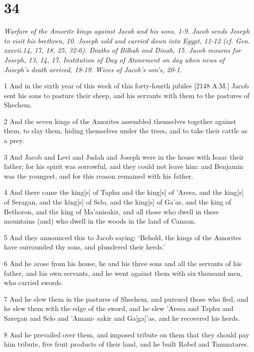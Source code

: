 \chapter{34}

\par \textit{Warfare of the Amorite kings against Jacob and his sons, 1-9. Jacob sends Joseph to visit his brethren, 10. Joseph sold and carried down into Egypt, 11-12 (cf. Gen. xxxvii.14, 17, 18, 25, 32-6). Deaths of Bilhah and Dinah, 15. Jacob mourns for Joseph, 13, 14, 17. Institution of Day of Atonement on day when news of Joseph's death arrived, 18-19. Wives of Jacob's son's, 20-1.}

\par 1 And in the sixth year of this week of this forty-fourth jubilee [2148 A.M.] Jacob sent his sons to pasture their sheep, and his servants with them to the pastures of Shechem.
\par 2 And the seven kings of the Amorites assembled themselves together against them, to slay them, hiding themselves under the trees, and to take their cattle as a prey.
\par 3 And Jacob and Levi and Judah and Joseph were in the house with Isaac their father; for his spirit was sorrowful, and they could not leave him: and Benjamin was the youngest, and for this reason remained with his father.
\par 4 And there came the king[s] of Taphu and the king[s] of 'Aresa, and the king[s] of Seragan, and the king[s] of Selo, and the king[s] of Ga'as, and the king of Bethoron, and the king of Ma'anisakir, and all those who dwell in these mountains (and) who dwell in the woods in the land of Canaan.
\par 5 And they announced this to Jacob saying: ‘Behold, the kings of the Amorites have surrounded thy sons, and plundered their herds.’
\par 6 And he arose from his house, he and his three sons and all the servants of his father, and his own servants, and he went against them with six thousand men, who carried swords.
\par 7 And he slew them in the pastures of Shechem, and pursued those who fled, and he slew them with the edge of the sword, and he slew 'Aresa and Taphu and Saregan and Selo and 'Amani- sakir and Ga[ga]'as, and he recovered his herds.
\par 8 And he prevailed over them, and imposed tribute on them that they should pay him tribute, five fruit products of their land, and he built Robel and Tamnatares.
